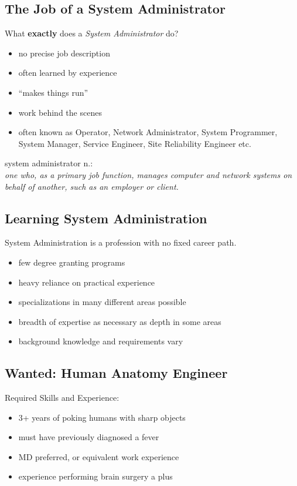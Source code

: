 \documentclass[xga]{xdvislides}
\begin{document}
\subsection{The Job of a System Administrator}
What {\bf exactly} does a {\em System Administrator} do?
\begin{itemize}
	\item no precise job description
	\item often learned by experience
	\item ``makes things run''
	\item work behind the scenes
	\item often known as Operator, Network Administrator, System Programmer, System
		Manager, Service Engineer, Site Reliability Engineer etc.
\end{itemize}
\vfill
system administrator n.: \\
{\em one who, as a primary job function,
	manages computer and network systems on behalf of another, such as an
	employer or client.}

\subsection{Learning System Administration}
System Administration is a profession with no fixed career path.

\begin{itemize}
	\item few degree granting programs
	\item heavy reliance on practical experience
	\item specializations in many different areas possible
	\item breadth of expertise as necessary as depth in some areas
	\item background knowledge and requirements vary
\end{itemize}

\subsection{Wanted: Human Anatomy Engineer}
Required Skills and Experience:

\begin{itemize}
	\item 3+ years of poking humans with sharp objects
	\item must have previously diagnosed a fever
	\item MD preferred, or equivalent work experience
	\item experience performing brain surgery a plus
\end{itemize}
\end{document}

